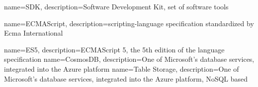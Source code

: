 {
	name=SDK,
	description={Software Development Kit, set of software tools}
}

{
	name=ECMAScript,
	description={scripting-language specification standardized by Ecma International}
}

{
	name=ES5,
	description={ECMAScript 5, the 5th edition of the language specification}
}
{
	name=CosmosDB,
	description={One of Microsoft's database services, integrated into the Azure platform}
}
{
	name=Table Storage,
	description={One of Microsoft's database services, integrated into the Azure platform, NoSQL based}
}